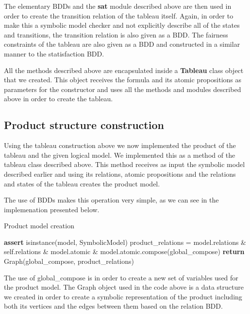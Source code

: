 \documentclass[11pt]{article}
\begin{document}
        The elementary BDDs and the \textbf{sat} module described above are then
        used in order to create the transition relation of the tableau itself.
        Again, in order to make this a symbolic model checker and not explicitly
        describe all of the states and transitions, the transition relation is
        also given as a BDD. The fairness constraints of the tableau are also 
        given as a BDD and constructed in a similar manner to the statisfaction
        BDD.

        All the methods described above are encapsulated inside a \textbf{Tableau}
        class object that we created. This object receives the formula and its
        atomic propositions as parameters for the constructor and uses all the
        methods and modules described above in order to create the tableau.

    \subsection{Product structure construction}
        Using the tableau construction above we now implemented the product of
        the tableau and the given logical model. We implemented this as a 
        method of the tableau class described above. This method receives as
        input the symbolic model described earlier and using its relations,
        atomic propositions and the relations and states of the tableau creates
        the product model.

        The use of BDDs makes this operation very simple, as we can see in the
        implemenation presented below.

        \begin{algorithm}[H]
            \caption{Product model creation}\label{product}
                \State \textbf{assert} isinstance(model, SymbolicModel)
                \State product\_relations = model.relations \& self.relations 
                    \quad\quad\& model.atomic \& model.atomic.compose(global\_compose)
                \State \textbf{return} Graph(global\_compose, product\_relations)
            \EndProcedure
        \end{algorithm}

        The use of global\_compose is in order to create a new set of variables
        used for the product model. The Graph object used in the code above is
        a data structure we created in order to create a symbolic representation
        of the product including both its vertices and the edges between them
        based on the relation BDD.
\end{document}
